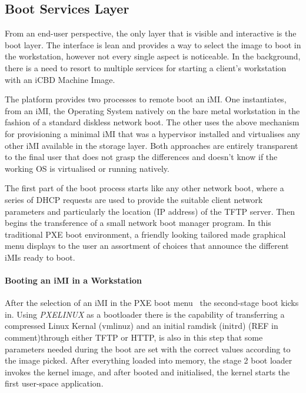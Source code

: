 \subsection{Boot Services Layer}
\label{sub:icbd_architecture_boot}


From an end-user perspective, the only layer that is visible and interactive is the boot layer. The interface is lean and provides a way to select the image to boot in the workstation, however not every single aspect is noticeable. In the background, there is a need to resort to multiple services for starting a client's workstation with an iCBD Machine Image.

The platform provides two processes to remote boot an iMI. One instantiates, from an iMI, the Operating System natively on the bare metal workstation in the fashion of a standard diskless network boot. The other uses the above mechanism for provisioning a minimal iMI that was a hypervisor installed and virtualises any other iMI available in the storage layer. Both approaches are entirely transparent to the final user that does not grasp the differences and doesn't know if the working OS is virtualised or running natively.

The first part of the boot process starts like any other network boot, where a series of DHCP requests are used to provide the suitable client network parameters and particularly the location (IP address) of the TFTP server. Then begins the transference of a small network boot manager program. In this traditional PXE boot environment, a friendly looking tailored made graphical menu displays to the user an assortment of choices that announce the different iMIs ready to boot.

\paragraph{Booting an iMI in a Workstation}
\label{subsub:booting_imi}
After the selection of an iMI in the PXE boot menu~\cite{ibm_linux_boot} the second-stage boot kicks in. Using \textit{PXELINUX} as a bootloader there is the capability of transferring a compressed Linux Kernal (vmlinuz) and an initial ramdisk (initrd) (REF in comment)through either TFTP or HTTP, is also in this step that some parameters needed during the boot are set with the correct values according to the image picked. After everything loaded into memory, the stage 2 boot loader invokes the kernel image, and after booted and initialised, the kernel starts the first user-space application. 


